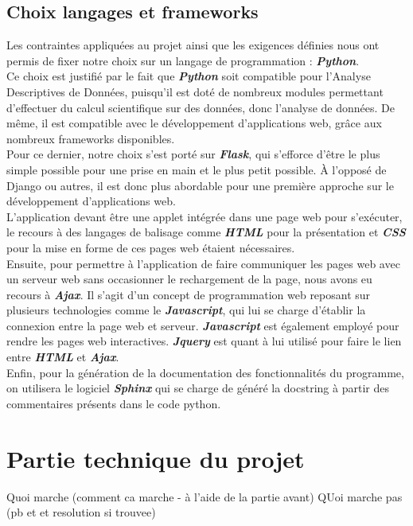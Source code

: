 			
		\subsection{Choix langages et frameworks}
		Les contraintes appliquées au projet ainsi que les exigences définies nous ont permis de fixer notre choix sur un langage de programmation : \textbf{\textit{Python}}.\\
		Ce choix est justifié par le fait que \textbf{\textit{Python}} soit compatible pour l'Analyse Descriptives de Données, puisqu'il est doté de nombreux modules permettant d'effectuer du calcul scientifique sur des données, donc l'analyse de données. De même, il est compatible avec le développement d'applications web, grâce aux nombreux frameworks disponibles.\\
		 Pour ce dernier, notre choix s'est porté sur \textbf{\textit{Flask}}, qui s’efforce d’être le plus simple possible pour une prise en main et le plus petit possible. À l'opposé de Django ou autres, il est donc plus abordable pour une première approche sur le développement d'applications web.\\
		
		L'application devant être une applet intégrée dans une page web pour s'exécuter, le recours à des langages de balisage comme \textbf{\textit{HTML}} pour la présentation et \textbf{\textit{CSS}} pour la mise en forme de ces pages web étaient nécessaires.\\
		
		Ensuite, pour permettre à l'application de faire communiquer les pages web avec un serveur web sans occasionner le rechargement de la page, nous avons eu recours à \textbf{\textit{Ajax}}. Il s'agit d'un concept de programmation web reposant sur plusieurs technologies comme le \textbf{\textit{Javascript}}, qui lui se charge d'établir la connexion entre la page web et serveur. \textbf{\textit{Javascript}} est également employé pour rendre les pages web interactives. \textbf{\textit{Jquery}} est quant à lui utilisé pour faire le lien entre \textbf{\textit{HTML}} et \textbf{\textit{Ajax}}.\\
		
		Enfin, pour la génération de la documentation des fonctionnalités du programme, on utilisera le logiciel \textbf{\textit{Sphinx}} qui se charge de généré la docstring à partir des commentaires présents dans le code python.\\
		
	\section{Partie technique du projet}
	Quoi marche (comment ca marche - à l'aide de la partie avant)
	QUoi marche pas (pb et et resolution si trouvee)
	
